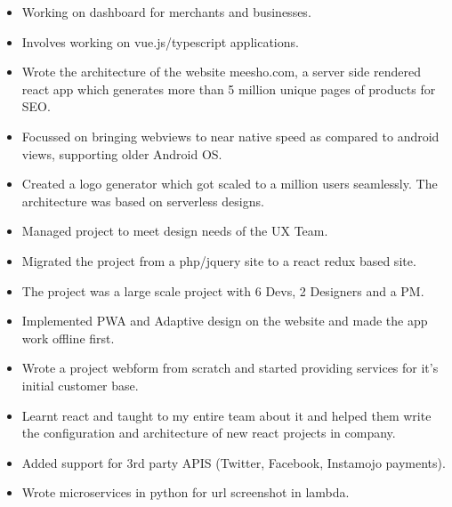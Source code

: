 \documentclass[10pt,a4paper,ragged2e,withhyper]{altacv}
\begin{document}
\begin{paracol}{2}


\begin{itemize}
\item Working on dashboard for merchants and businesses.
\item Involves working on vue.js/typescript applications.
\end{itemize}
\divider


\begin{itemize}
\item Wrote the architecture of the website meesho.com, a server side rendered react app which generates more than 5 million unique pages of products for SEO.
\item Focussed on bringing webviews to near native speed as compared to android views, supporting older Android OS.
\item Created a logo generator which got scaled to a million users seamlessly. The architecture was based on serverless designs.
\end{itemize}

\divider

\begin{itemize}
\item Managed project to meet design needs of the UX Team.
\item Migrated the project from a php/jquery site to a react redux based site.
\item The project was a large scale project with 6 Devs, 2 Designers and a PM.
\item Implemented PWA and Adaptive design on the website and made the app work offline first.
\end{itemize}

\divider


\begin{itemize}
\item Wrote a project webform from scratch and started providing services for it's initial customer base.
\item Learnt react and taught to my entire team about it and helped them write the configuration and architecture of new react projects in company.
\item Added support for 3rd party APIS (Twitter, Facebook, Instamojo payments).
\item Wrote microservices in python for url screenshot in lambda.
\end{itemize}


\end{paracol}
\end{document}
